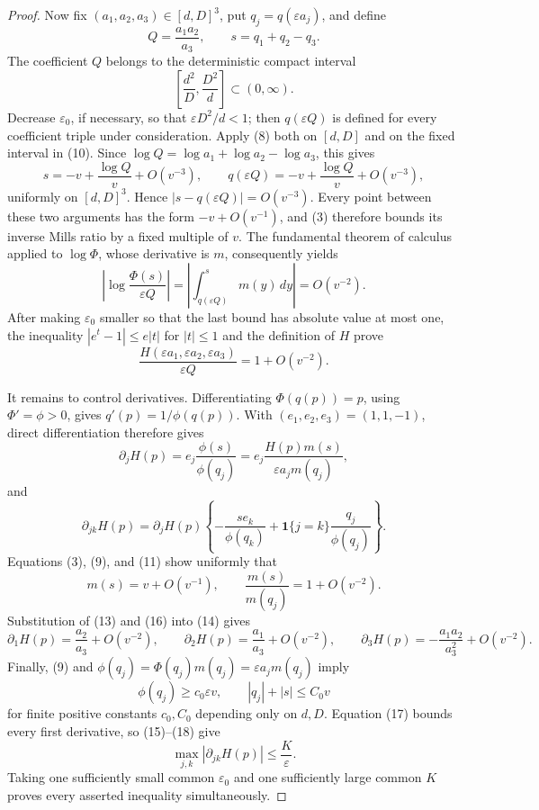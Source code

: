 \documentclass{article}
\begin{document}
\begin{proof}
Now fix \((a_1,a_2,a_3)\in[d,D]^3\), put \(q_j=q(\varepsilon a_j)\), and define
\[
 Q=\frac{a_1a_2}{a_3},
 \qquad s=q_1+q_2-q_3.
\]
The coefficient \(Q\) belongs to the deterministic compact interval
\[
 \left[\frac{d^2}{D},\frac{D^2}{d}\right]\subset(0,\infty).
\tag{10}
\]
Decrease \(\varepsilon_0\), if necessary, so that \(\varepsilon D^2/d<1\); then \(q(\varepsilon Q)\) is defined for every coefficient triple under consideration.
Apply (8) both on \([d,D]\) and on the fixed interval in (10). Since \(\log Q=\log a_1+\log a_2-\log a_3\), this gives
\[
 s=-v+\frac{\log Q}{v}+O(v^{-3}),
 \qquad
 q(\varepsilon Q)=-v+\frac{\log Q}{v}+O(v^{-3}),
\tag{11}
\]
uniformly on \([d,D]^3\). Hence \(|s-q(\varepsilon Q)|=O(v^{-3})\). Every point between these two arguments has the form \(-v+O(v^{-1})\), and (3) therefore bounds its inverse Mills ratio by a fixed multiple of \(v\). The fundamental theorem of calculus applied to \(\log\Phi\), whose derivative is \(m\), consequently yields
\[
 \left|\log\frac{\Phi(s)}{\varepsilon Q}\right|
 =\left|\int_{q(\varepsilon Q)}^s m(y)\,dy\right|
 =O(v^{-2}).
\tag{12}
\]
After making \(\varepsilon_0\) smaller so that the last bound has absolute value at most one, the inequality \(|e^t-1|\leq e|t|\) for \(|t|\leq1\) and the definition of \(H\) prove
\[
 \frac{H(\varepsilon a_1,\varepsilon a_2,\varepsilon a_3)}{\varepsilon Q}
 =1+O(v^{-2}).
\tag{13}
\]

It remains to control derivatives. Differentiating \(\Phi(q(p))=p\), using \(\Phi'=\phi>0\), gives \(q'(p)=1/\phi(q(p))\). With \((e_1,e_2,e_3)=(1,1,-1)\), direct differentiation therefore gives
\[
 \partial_jH(p)=e_j\frac{\phi(s)}{\phi(q_j)}
 =e_j\frac{H(p)m(s)}{\varepsilon a_jm(q_j)},
\tag{14}
\]
and
\[
 \partial_{jk}H(p)=\partial_jH(p)
 \left\{-\frac{s e_k}{\phi(q_k)}
 +\boldsymbol 1\{j=k\}\frac{q_j}{\phi(q_j)}\right\}.
\tag{15}
\]
Equations (3), (9), and (11) show uniformly that
\[
 m(s)=v+O(v^{-1}),
 \qquad \frac{m(s)}{m(q_j)}=1+O(v^{-2}).
\tag{16}
\]
Substitution of (13) and (16) into (14) gives
\[
 \partial_1H(p)=\frac{a_2}{a_3}+O(v^{-2}),\qquad
 \partial_2H(p)=\frac{a_1}{a_3}+O(v^{-2}),\qquad
 \partial_3H(p)=-\frac{a_1a_2}{a_3^2}+O(v^{-2}).
\tag{17}
\]
Finally, (9) and \(\phi(q_j)=\Phi(q_j)m(q_j)=\varepsilon a_jm(q_j)\) imply
\[
 \phi(q_j)\geq c_0\varepsilon v,
 \qquad |q_j|+|s|\leq C_0v
\tag{18}
\]
for finite positive constants \(c_0,C_0\) depending only on \(d,D\). Equation (17) bounds every first derivative, so (15)--(18) give
\[
 \max_{j,k}|\partial_{jk}H(p)|\leq\frac{K}{\varepsilon}.
\]
Taking one sufficiently small common \(\varepsilon_0\) and one sufficiently large common \(K\) proves every asserted inequality simultaneously.
\end{proof}
\end{document}
